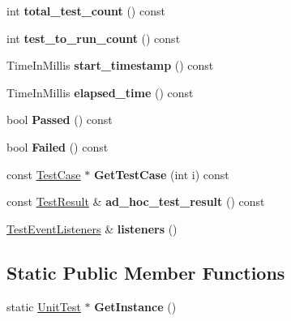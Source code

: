 \begin{DoxyCompactItemize}
\mbox{\label{classtesting_1_1_unit_test_af6e02fcf76fd7247687f4e8af6e7ef41}} 
int {\bfseries total\+\_\+test\+\_\+count} () const
\item 
\mbox{\label{classtesting_1_1_unit_test_a461f46b2976f135d2a65e8d3def746e9}} 
int {\bfseries test\+\_\+to\+\_\+run\+\_\+count} () const
\item 
\mbox{\label{classtesting_1_1_unit_test_a3d83fe1cc5570a1c34f9754b0f56d65f}} 
Time\+In\+Millis {\bfseries start\+\_\+timestamp} () const
\item 
\mbox{\label{classtesting_1_1_unit_test_acf608411a17cb3b40a1e9d724f262b3b}} 
Time\+In\+Millis {\bfseries elapsed\+\_\+time} () const
\item 
\mbox{\label{classtesting_1_1_unit_test_a7c9b327bc14cb8a282c789dc6513a55b}} 
bool {\bfseries Passed} () const
\item 
\mbox{\label{classtesting_1_1_unit_test_a706f29e765916616b11a271a65948727}} 
bool {\bfseries Failed} () const
\item 
\mbox{\label{classtesting_1_1_unit_test_a724d4c8be4481e0c1523a22b72dc7dac}} 
const \mbox{\hyperlink{classtesting_1_1_test_case}{Test\+Case}} $\ast$ {\bfseries Get\+Test\+Case} (int i) const
\item 
\mbox{\label{classtesting_1_1_unit_test_aa59dde4c3dc43a920ed142a27670686c}} 
const \mbox{\hyperlink{classtesting_1_1_test_result}{Test\+Result}} \& {\bfseries ad\+\_\+hoc\+\_\+test\+\_\+result} () const
\item 
\mbox{\label{classtesting_1_1_unit_test_aac10085cf7c0d1751306db10cdd953cb}} 
\mbox{\hyperlink{classtesting_1_1_test_event_listeners}{Test\+Event\+Listeners}} \& {\bfseries listeners} ()
\end{DoxyCompactItemize}
\subsection*{Static Public Member Functions}
\begin{DoxyCompactItemize}
\item 
\mbox{\label{classtesting_1_1_unit_test_a24192400b70b3b946746954e9574fb8e}} 
static \mbox{\hyperlink{classtesting_1_1_unit_test}{Unit\+Test}} $\ast$ {\bfseries Get\+Instance} ()
\end{DoxyCompactItemize}
